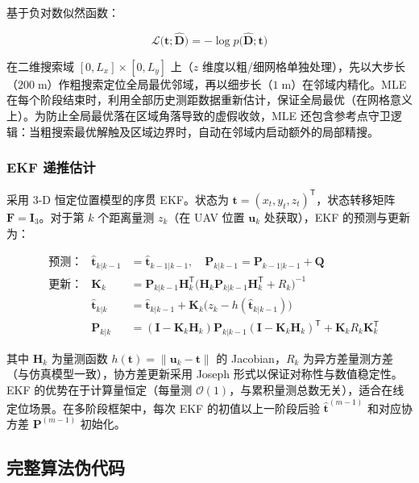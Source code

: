 基于负对数似然函数\cite{Kay1993}：

\begin{equation}
\mathcal{L}\bigl(\mathbf{t};\widehat{\mathbf{D}}\bigr)=
-\log p\bigl(\widehat{\mathbf{D}};\mathbf{t}\bigr)
\end{equation}

在二维搜索域 $[0,L_x]\times[0,L_y]$ 上（$z$ 维度以粗/细网格单独处理），先以大步长（$200\;\mathrm{m}$）作粗搜索定位全局最优邻域，再以细步长（$1\;\mathrm{m}$）在邻域内精化。MLE 在每个阶段结束时，利用全部历史测距数据重新估计，保证全局最优（在网格意义上）。为防止全局最优落在区域角落导致的虚假收敛，MLE 还包含参考点守卫逻辑：当粗搜索最优解触及区域边界时，自动在邻域内启动额外的局部精搜。

\subsubsection{EKF 递推估计}

采用 3-D 恒定位置模型的序贯 EKF\cite{Rangzenegger2020}。状态为 $\mathbf{t}=(x_t,y_t,z_t)^{\mathsf{T}}$，状态转移矩阵 $\mathbf{F}=\mathbf{I}_3$。对于第 $k$ 个距离量测 $z_k$（在 UAV 位置 $\mathbf{u}_k$ 处获取），EKF 的预测与更新为：

\begin{align}
&\text{预测：}&\hat{\mathbf{t}}_{k|k-1}&=\hat{\mathbf{t}}_{k-1|k-1},\quad
\mathbf{P}_{k|k-1}=\mathbf{P}_{k-1|k-1}+\mathbf{Q} \label{eq:ekf_predict}\\
&\text{更新：}&\mathbf{K}_k&=\mathbf{P}_{k|k-1}\mathbf{H}_k^{\mathsf{T}}
\bigl(\mathbf{H}_k\mathbf{P}_{k|k-1}\mathbf{H}_k^{\mathsf{T}}+R_k\bigr)^{-1} \nonumber\\
&&\hat{\mathbf{t}}_{k|k}&=\hat{\mathbf{t}}_{k|k-1}+
\mathbf{K}_k\bigl(z_k-h(\hat{\mathbf{t}}_{k|k-1})\bigr) \label{eq:ekf_update}\\
&&\mathbf{P}_{k|k}&=(\mathbf{I}-\mathbf{K}_k\mathbf{H}_k)
\mathbf{P}_{k|k-1}(\mathbf{I}-\mathbf{K}_k\mathbf{H}_k)^{\mathsf{T}}+
\mathbf{K}_k R_k\mathbf{K}_k^{\mathsf{T}} \nonumber
\end{align}

其中 $\mathbf{H}_k$ 为量测函数 $h(\mathbf{t})=\|\mathbf{u}_k-\mathbf{t}\|$ 的 Jacobian，$R_k$ 为异方差量测方差（与仿真模型一致），协方差更新采用 Joseph 形式以保证对称性与数值稳定性。EKF 的优势在于计算量恒定（每量测 $\mathcal{O}(1)$，与累积量测总数无关），适合在线定位场景。在多阶段框架中，每次 EKF 的初值以上一阶段后验 $\hat{\mathbf{t}}^{(m-1)}$ 和对应协方差 $\mathbf{P}^{(m-1)}$ 初始化。

\subsection{完整算法伪代码}

